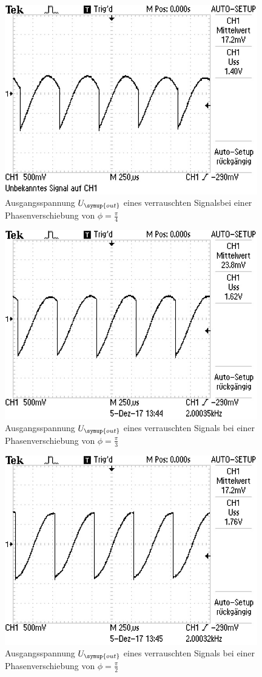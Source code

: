 \begin{figure}
  \centering
  \includegraphics[width=11cm]{data/rauschen_45.jpg}
  \caption{Ausgangsspannung $U_{\symup{out}}$  eines verrauschten Signalsbei einer Phasenverschiebung
  von $\phi=\frac{\pi}{4}$}
  \label{fig:rauschen_45}
\end{figure}

\begin{figure}
  \centering
  \includegraphics[width=11cm]{data/rauschen_60.jpg}
  \caption{Ausgangsspannung $U_{\symup{out}}$ eines verrauschten Signals bei einer Phasenverschiebung
  von $\phi=\frac{\pi}{3}$}
  \label{fig:rauschen_60}
\end{figure}

\begin{figure}
  \centering
  \includegraphics[width=11cm]{data/rauschen_90.jpg}
  \caption{Ausgangsspannung $U_{\symup{out}}$ eines verrauschten Signals bei einer Phasenverschiebung
  von $\phi=\frac{\pi}{2}$}
  \label{fig:rauschen_90}
\end{figure}
